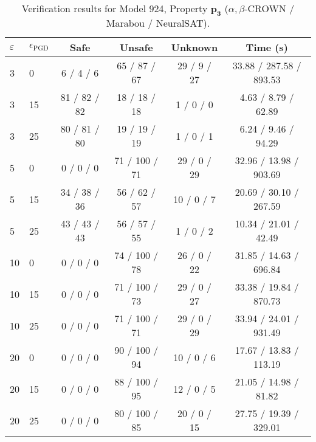 \begin{table}[htbp]\centering
\caption{\small Verification results for Model 924, Property $\mathbf{p_{3}}$ ($\alpha,\beta$-CROWN / Marabou / NeuralSAT).}
\label{tab:model924_p3}
\begin{tabular}{llcccc}
\toprule
$\varepsilon$ & $\epsilon_{\scriptscriptstyle\mathrm{PGD}}$ & Safe & Unsafe & Unknown & Time (s) \\
\midrule
3 & 0 & 6 / 4 / 6 & 65 / 87 / 67 & 29 / 9 / 27 & 33.88 / 287.58 / 893.53 \\
3 & 15 & 81 / 82 / 82 & 18 / 18 / 18 & 1 / 0 / 0 & 4.63 / 8.79 / 62.89 \\
3 & 25 & 80 / 81 / 80 & 19 / 19 / 19 & 1 / 0 / 1 & 6.24 / 9.46 / 94.29 \\
5 & 0 & 0 / 0 / 0 & 71 / 100 / 71 & 29 / 0 / 29 & 32.96 / 13.98 / 903.69 \\
5 & 15 & 34 / 38 / 36 & 56 / 62 / 57 & 10 / 0 / 7 & 20.69 / 30.10 / 267.59 \\
5 & 25 & 43 / 43 / 43 & 56 / 57 / 55 & 1 / 0 / 2 & 10.34 / 21.01 / 42.49 \\
10 & 0 & 0 / 0 / 0 & 74 / 100 / 78 & 26 / 0 / 22 & 31.85 / 14.63 / 696.84 \\
10 & 15 & 0 / 0 / 0 & 71 / 100 / 73 & 29 / 0 / 27 & 33.38 / 19.84 / 870.73 \\
10 & 25 & 0 / 0 / 0 & 71 / 100 / 71 & 29 / 0 / 29 & 33.94 / 24.01 / 931.49 \\
20 & 0 & 0 / 0 / 0 & 90 / 100 / 94 & 10 / 0 / 6 & 17.67 / 13.83 / 113.19 \\
20 & 15 & 0 / 0 / 0 & 88 / 100 / 95 & 12 / 0 / 5 & 21.05 / 14.98 / 81.82 \\
20 & 25 & 0 / 0 / 0 & 80 / 100 / 85 & 20 / 0 / 15 & 27.75 / 19.39 / 329.01 \\
\bottomrule
\end{tabular}
\end{table}
